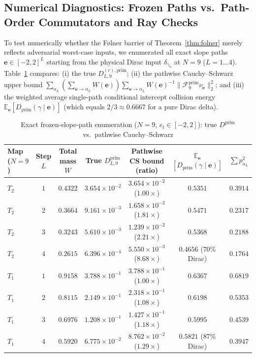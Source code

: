 \documentclass[11pt,a4paper]{article}
\numberwithin{equation}{section}
\theoremstyle{definition}
\theoremstyle{remark}
\newcommand{\E}{\mathbb{E}}
\newcommand{\cF}{\mathcal{F}}
\newcommand{\prim}{\mathrm{prim}}
\begin{document}
\subsection{Numerical Diagnostics: Frozen Paths vs.\ Path-Order Commutators and Ray Checks}\label{subsec:frozen_vs_commutator}

To test numerically whether the F{\o}lner barrier of Theorem~\ref{thm:folner} merely reflects adversarial worst-case inputs, we enumerated all exact slope paths $\boldsymbol{e} \in [-2, 2]^L$ starting from the physical Dirac input $\delta_{\gamma_0}$ at $N = 9$ ($L = 1 \dots 4$). Table~\ref{tab:frozen_vs_comm} compares:
(i) the true $D_{L, 9}^{(r), \prim}$;
(ii) the pathwise Cauchy--Schwarz upper bound $\sum_{\alpha_L} (\sum_{\boldsymbol{e}\to\alpha_L} W(\boldsymbol{e})) \sum_{\boldsymbol{e}\to\alpha_L} W(\boldsymbol{e})^{-1}\|\cF_9^{\prim}\nu_{\boldsymbol{e}}\|_2^2$; and
(iii) the weighted average single-path conditional intercept collision energy $\E_{\boldsymbol{e}}[D_{\prim}(\gamma \mid \boldsymbol{e})]$ (which equals $2/3 \approx 0.6667$ for a pure Dirac delta).

\begin{table}[htbp]
\centering
\caption{Exact frozen-slope-path enumeration ($N=9$, $e_t \in [-2, 2]$): true $D^{\prim}$ vs.\ pathwise Cauchy--Schwarz}
\label{tab:frozen_vs_comm}
\small
\setlength{\tabcolsep}{4pt}
\begin{tabular}{@{}lcccccc@{}}
\toprule
Map ($N=9$) & Step $L$ & Total mass $W$ & True $D_{L, 9}^{\prim}$ & \shortstack{Pathwise CS bound\\(ratio)} & \shortstack{$\E_{\boldsymbol{e}}$\\$[D_{\prim}(\gamma \mid \boldsymbol{e})]$} & $\sum p_{\alpha_L}^2$ \\
\midrule
$T_2$ & $1$ & $0.4322$ & $3.654\times 10^{-2}$ & $3.654\times 10^{-2}$ ($1.00\times$) & $0.5351$ & $0.3914$ \\
$T_2$ & $2$ & $0.3664$ & $9.161\times 10^{-3}$ & $1.658\times 10^{-2}$ ($1.81\times$) & $0.5471$ & $0.2317$ \\
$T_2$ & $3$ & $0.3243$ & $5.610\times 10^{-3}$ & $1.239\times 10^{-2}$ ($2.21\times$) & $0.5368$ & $0.2188$ \\
$T_2$ & $4$ & $0.2615$ & $6.396\times 10^{-4}$ & $5.550\times 10^{-3}$ ($8.68\times$) & $0.4656$ ($70\%$ Dirac) & $0.1764$ \\
$T_1$ & $1$ & $0.9158$ & $3.788\times 10^{-1}$ & $3.788\times 10^{-1}$ ($1.00\times$) & $0.6367$ & $0.6819$ \\
$T_1$ & $2$ & $0.8115$ & $2.149\times 10^{-1}$ & $2.318\times 10^{-1}$ ($1.08\times$) & $0.6198$ & $0.5353$ \\
$T_1$ & $3$ & $0.6976$ & $1.208\times 10^{-1}$ & $1.427\times 10^{-1}$ ($1.18\times$) & $0.5995$ & $0.4539$ \\
$T_1$ & $4$ & $0.5920$ & $6.775\times 10^{-2}$ & $8.762\times 10^{-2}$ ($1.29\times$) & $0.5821$ ($87\%$ Dirac) & $0.3947$ \\
\bottomrule
\end{tabular}
\end{table}
\end{document}
